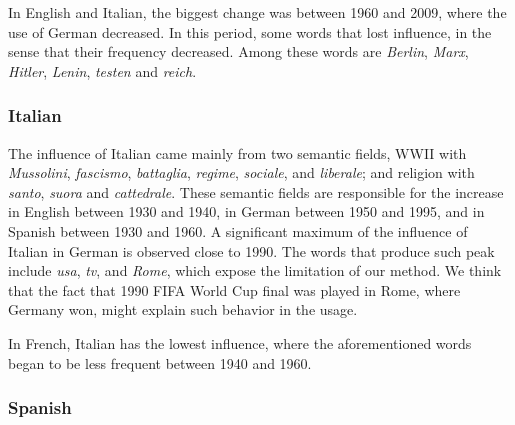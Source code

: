 \documentclass[10pt,letterpaper]{article} %
\begin{document}
In English and Italian, the biggest change was between 1960 and 2009, where the
use of German decreased. In this period, some words that lost influence, in the
sense that their frequency decreased. 
Among these words are 
\textit{Berlin}, \textit{Marx},
\textit{Hitler}, \textit{Lenin}, \textit{testen}  and \textit{reich}.
\subsubsection*{Italian} %


The influence of Italian came mainly from two semantic fields,  WWII with
\textit{Mussolini}, \textit{fascismo}, \textit{battaglia}, \textit{regime},
\textit{sociale}, and \textit{liberale}; and religion with \textit{santo},
\textit{suora} and \textit{cattedrale}. These semantic fields are
responsible for the increase in English between 1930 and 1940, in German
between 1950 and 1995, and in Spanish between 1930 and 1960.
A significant maximum of the influence of Italian in German is observed close to 1990. 
The words that produce such peak include 
\textit{usa},  \textit{tv}, and \textit{Rome}, which expose the limitation of our method. 
We think that the fact that 1990 FIFA World Cup final was played in Rome, where Germany won, might explain such behavior in the usage. 
% 

In French, Italian has the lowest influence, where the aforementioned words
began to be less frequent between 1940 and 1960.
\subsubsection*{Spanish} %
\end{document}
